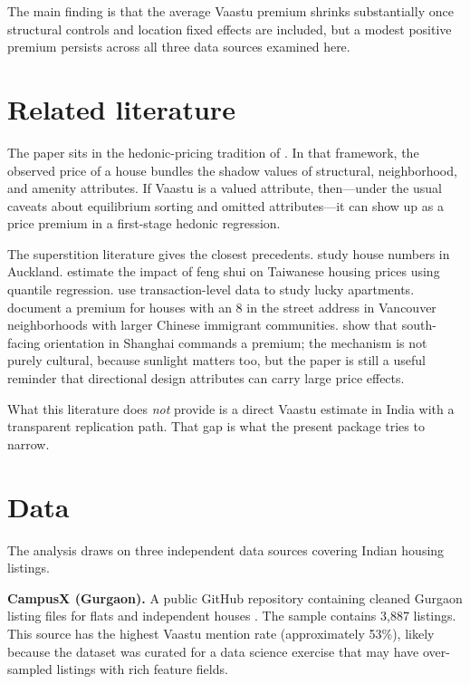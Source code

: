 \documentclass[11pt]{article}
\begin{document}
The main finding is that the average Vaastu premium shrinks substantially once structural controls and location fixed effects are included, but a modest positive premium persists across all three data sources examined here.

\section{Related literature}

The paper sits in the hedonic-pricing tradition of \citet{rosen1974}. In that framework, the observed price of a house bundles the shadow values of structural, neighborhood, and amenity attributes. If Vaastu is a valued attribute, then---under the usual caveats about equilibrium sorting and omitted attributes---it can show up as a price premium in a first-stage hedonic regression.

The superstition literature gives the closest precedents. \citet{bourassa_peng1999} study house numbers in Auckland. \citet{lin_chen_twu2012} estimate the impact of feng shui on Taiwanese housing prices using quantile regression. \citet{shum_sun_ye2014} use transaction-level data to study lucky apartments. \citet{fortin_hill_huang2014} document a premium for houses with an 8 in the street address in Vancouver neighborhoods with larger Chinese immigrant communities. \citet{lu2018} show that south-facing orientation in Shanghai commands a premium; the mechanism is not purely cultural, because sunlight matters too, but the paper is still a useful reminder that directional design attributes can carry large price effects.

What this literature does \emph{not} provide is a direct Vaastu estimate in India with a transparent replication path. That gap is what the present package tries to narrow.

\section{Data}

The analysis draws on three independent data sources covering Indian housing listings.

\textbf{CampusX (Gurgaon).} A public GitHub repository containing cleaned Gurgaon listing files for flats and independent houses \citep{campusx_dsmp_capstone}. The sample contains 3,887 listings. This source has the highest Vaastu mention rate (approximately 53\%), likely because the dataset was curated for a data science exercise that may have over-sampled listings with rich feature fields.
\end{document}
